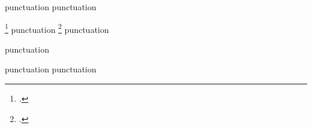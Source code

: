 \parencites( pre )( post )[ pre ][ post ]{ key }[ pre ][ post ]{ key } punctuation
\Parencites( pre )( post )[ pre ][ post ]{ key }[ pre ][ post ]{ key } punctuation

\footcites( pre )( post )[ pre ][ post ]{ key }[ pre ][ post ]{ key } punctuation
\Footcites( pre )( post )[ pre ][ post ]{ key }[ pre ][ post ]{ key } punctuation

\supercites( pre )( post )[ pre ][ post ]{ key }[ pre ][ post ]{ key } punctuation

\autocites( pre )( post )[ pre ][ post ]{ key }[ pre ][ post ]{ key } punctuation
\Autocites( pre )( post )[ pre ][ post ]{ key }[ pre ][ post ]{ key } punctuation
